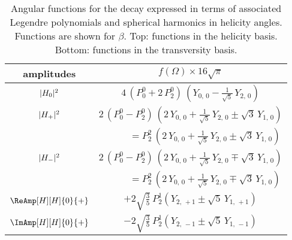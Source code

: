 \begin{table}[p]
  \centering
  \caption{Angular functions for the \BstoJpsiphi{} decay expressed in terms of associated Legendre polynomials and spherical harmonics
           in helicity angles. Functions are shown for $\beta$\texteq{}.
           Top: functions in the helicity basis. Bottom: functions in the transversity basis.}
  \label{tab:angDistJpsiphiPY}
  \renewcommand{\arraystretch}{1.2}
  \begin{tabular}{cc}
    \hline
    amplitudes                             &
      $f(\Omega) \times 16\sqrt{\pi}$      \\

    \hline\hline

    $\AmpSq[H]{0}$  &
      $4\, (P_0^0 + 2\, P_2^0)\, (Y_{0,\,0} - \tfrac{1}{\sqrt{5}}\, Y_{2,\,0})$  \\
    \hline

    $\AmpSq[H]{+}$  &
      $2\, (P_0^0 - P_2^0)\, (2\, Y_{0,\,0} + \tfrac{1}{\sqrt{5}}\, Y_{2,\,0} \pm \sqrt{3}\, Y_{1,\,0})$  \\
      &
      $\qquad\quad = P_2^2\, (2\, Y_{0,\,0} + \tfrac{1}{\sqrt{5}}\, Y_{2,\,0} \pm \sqrt{3}\, Y_{1,\,0})$  \\
    \hline

    $\AmpSq[H]{-}$  &
      $2\, (P_0^0 - P_2^0)\, (2\, Y_{0,\,0} + \tfrac{1}{\sqrt{5}}\, Y_{2,\,0} \mp \sqrt{3}\, Y_{1,\,0})$  \\
      &
      $\qquad\quad = P_2^2\, (2\, Y_{0,\,0} + \tfrac{1}{\sqrt{5}}\, Y_{2,\,0} \mp \sqrt{3}\, Y_{1,\,0})$  \\
    \hline

    $\ReAmp[H][H]{0}{+}$  &
      $+2\sqrt{\tfrac{3}{5}}\, P_2^1 (Y_{2,\,+1} \pm \sqrt{5}\, Y_{1,\,+1})$  \\
    \hline

    $\ImAmp[H][H]{0}{+}$  &
      $-2\sqrt{\tfrac{3}{5}}\, P_2^1 (Y_{2,\,-1} \pm \sqrt{5}\, Y_{1,\,-1})$  \\
    \hline


\end{tabular}
\end{table}
